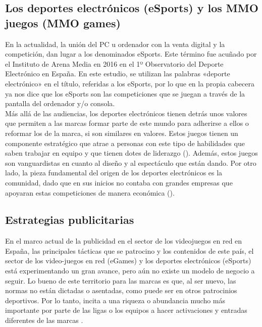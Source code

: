 \documentclass[a4paper,11pt]{article}
\begin{document}
\subsection{Los deportes electrónicos (eSports) y los MMO juegos (MMO games)}
En la actualidad, la unión del PC u ordenador con la venta digital y la competición, dan lugar a los denominados eSports. Este término fue acuñado por el Instituto de Arena Media en 2016 en el 1º Observatorio del Deporte Electrónico en España. En este estudio, se utilizan las palabras «deporte electrónico» en el título, referidas a los eSports, por lo que en la propia cabecera ya nos dice que los eSports son las competiciones que se juegan a través de la pantalla del ordenador y/o consola.\\
Más allá de las audiencias, los deportes electrónicos tienen detrás unos valores que permiten a las marcas formar parte de este mundo para adherirse a ellos o reformar los de la marca, si son similares en valores. Estos juegos tienen un componente estratégico que atrae a personas con este tipo de habilidades que saben trabajar en equipo y que tienen dotes de liderazgo (\cite{Liu2015}). Además, estos juegos son vanguardistas en cuanto al diseño y al espectáculo que están dando. Por otro lado, la pieza fundamental del origen de los deportes electrónicos es la comunidad, dado que en sus inicios no contaba con grandes empresas que apoyaran estas competiciones de manera económica (\cite{Agarwal2016}).

\subsection{Estrategias publicitarias}
En el marco actual de la publicidad en el sector de los videojuegos en red en España, las principales tácticas que se patrocino y los contenidos de este país, el sector de los video-juegos en red (eGames) y los deportes electrónicos (eSports) está experimentando un gran avance, pero aún no existe un modelo de negocio a seguir. Lo bueno de este territorio para las marcas es que, al ser nuevo, las normas no están dictadas o asentadas, como puede ser en otros patrocinios deportivos. Por lo tanto, incita a una riqueza o abundancia mucho más importante por parte de las ligas o los equipos a hacer activaciones y entradas diferentes de las marcas \cite{Kesharwani2017}.
\end{document}
